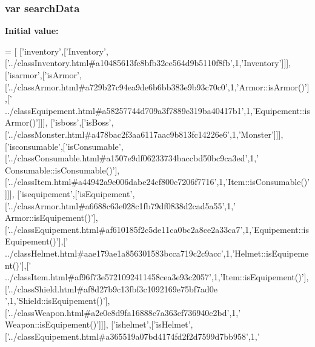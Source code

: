 \subsubsection[{search\-Data}]{\setlength{\rightskip}{0pt plus 5cm}var search\-Data}\label{functions__8_8js_ad01a7523f103d6242ef9b0451861231e}
{\bfseries Initial value\-:}
\begin{DoxyCode}
=
[
  [\textcolor{stringliteral}{'inventory'},[\textcolor{stringliteral}{'Inventory'},[\textcolor{stringliteral}{'../classInventory.html#a10485613fc8bfb32ee564d9b5110f8fb'},1,\textcolor{stringliteral}{'Inventory'}]]],
  [\textcolor{stringliteral}{'isarmor'},[\textcolor{stringliteral}{'isArmor'},[\textcolor{stringliteral}{'../classArmor.html#a729b27c94ea9de6b6bb383e9b93c70c0'},1,\textcolor{stringliteral}{'Armor::isArmor()'}],[\textcolor{stringliteral}{'
      ../classEquipement.html#a58257744d709a3f7889e319ba40417b1'},1,\textcolor{stringliteral}{'Equipement::isArmor()'}]]],
  [\textcolor{stringliteral}{'isboss'},[\textcolor{stringliteral}{'isBoss'},[\textcolor{stringliteral}{'../classMonster.html#a478bac2f3aa6117aac9b813fc14226e6'},1,\textcolor{stringliteral}{'Monster'}]]],
  [\textcolor{stringliteral}{'isconsumable'},[\textcolor{stringliteral}{'isConsumable'},[\textcolor{stringliteral}{'../classConsumable.html#a1507e9df06233734baccbd50bc9ca3ed'},1,\textcolor{stringliteral}{'
      Consumable::isConsumable()'}],[\textcolor{stringliteral}{'../classItem.html#a44942a9e006dabe24cf800c7206f7716'},1,\textcolor{stringliteral}{'Item::isConsumable()'}]]],
  [\textcolor{stringliteral}{'isequipement'},[\textcolor{stringliteral}{'isEquipement'},[\textcolor{stringliteral}{'../classArmor.html#a6688c63e028c1fb79df0838d2cad5a55'},1,\textcolor{stringliteral}{'
      Armor::isEquipement()'}],[\textcolor{stringliteral}{'../classEquipement.html#af610185f2c5de11ca0bc2a8ce2a33ca7'},1,\textcolor{stringliteral}{'Equipement::isEquipement()'}],[\textcolor{stringliteral}{'
      ../classHelmet.html#aae179ae1a856301583bcca719c2c9acc'},1,\textcolor{stringliteral}{'Helmet::isEquipement()'}],[\textcolor{stringliteral}{'
      ../classItem.html#af96f73e5721092411458cea3e93c2057'},1,\textcolor{stringliteral}{'Item::isEquipement()'}],[\textcolor{stringliteral}{'../classShield.html#af8d27b9c13fbf3c1092169e75bf7ad0e
      '},1,\textcolor{stringliteral}{'Shield::isEquipement()'}],[\textcolor{stringliteral}{'../classWeapon.html#a2e0e8d9fa16888c7a363ef736940c2bd'},1,\textcolor{stringliteral}{'
      Weapon::isEquipement()'}]]],
  [\textcolor{stringliteral}{'ishelmet'},[\textcolor{stringliteral}{'isHelmet'},[\textcolor{stringliteral}{'../classEquipement.html#a365519a07bd4174fd2f2d7599d7bb958'},1,\textcolor{stringliteral}{'
}
\end{DoxyCode}

